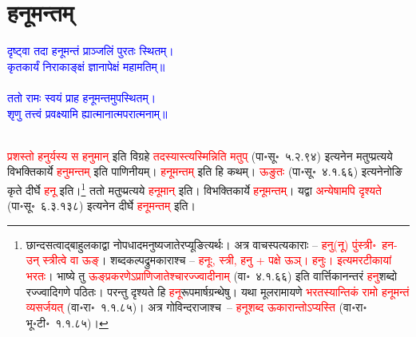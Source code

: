 \section[हनूमन्तम्]{हनूमन्तम्}
\centering\textcolor{blue}{दृष्ट्वा तदा हनूमन्तं प्राञ्जलिं पुरतः स्थितम्।\nopagebreak\\
कृतकार्यं निराकाङ्क्षं ज्ञानापेक्षं महामतिम्॥}\nopagebreak\\
\\
\centering\textcolor{blue}{ततो रामः स्वयं प्राह हनूमन्तमुपस्थितम्।\nopagebreak\\
शृणु तत्त्वं प्रवक्ष्यामि ह्यात्मानात्मपरात्मनाम्॥}\nopagebreak\\
\\
\begin{sloppypar}\justifying\noindent\hspace{10mm} \textcolor{red}{प्रशस्तो हनुर्यस्य स हनुमान्} इति विग्रहे \textcolor{red}{तदस्यास्त्यस्मिन्निति मतुप्} (पा॰सू॰~५.२.९४) इत्यनेन मतुप्प्रत्यये विभक्ति\-कार्ये \textcolor{red}{हनुमन्तम्} इति पाणिनीयम्। \textcolor{red}{हनूमन्तम्} इति हि कथम्। \textcolor{red}{ऊङुतः} (पा॰सू॰~४.१.६६) इत्यनेनोङि कृते दीर्घे \textcolor{red}{हनू} इति।\footnote{छान्दसत्वाद्बाहुलकाद्वा नोपधादमनुष्य\-जातेरप्यूङित्यर्थः। अत्र वाचस्पत्य\-काराः – \textcolor{red}{हनु(नू) पुंस्त्री॰~हन-उन् स्त्रीत्वे वा ऊङ्}। शब्दकल्पद्रुम\-काराश्च – \textcolor{red}{हनूः, स्त्री, हनु + पक्षे ऊञ्। हनुः। इत्यमरटीकायां भरतः}। भाष्ये तु \textcolor{red}{ऊङ्प्रकरणेऽप्राणिजातेश्चारज्ज्वादीनाम्} (वा॰~४.१.६६) इति वार्त्तिकानन्तरं \textcolor{red}{हनु}शब्दो रज्ज्वादिगणे पठितः। परन्तु दृश्यते हि \textcolor{red}{हनू}\-रूपमार्षग्रन्थेषु। यथा मूल\-रामायणे \textcolor{red}{भरतस्यान्तिकं रामो हनूमन्तं व्यसर्जयत्} (वा॰रा॰~१.१.८५)। अत्र गोविन्दराजाश्च~– \textcolor{red}{हनूशब्द ऊकारान्तोऽप्यस्ति} (वा॰रा॰ भू॰टी॰~१.१.८५)।} ततो मतुप्प्रत्यये \textcolor{red}{हनूमान्} इति। विभक्ति\-कार्ये \textcolor{red}{हनूमन्तम्}। यद्वा \textcolor{red}{अन्येषामपि दृश्यते} (पा॰सू॰~६.३.१३८) इत्यनेन दीर्घे \textcolor{red}{हनूमन्तम्} इति।\end{sloppypar}
